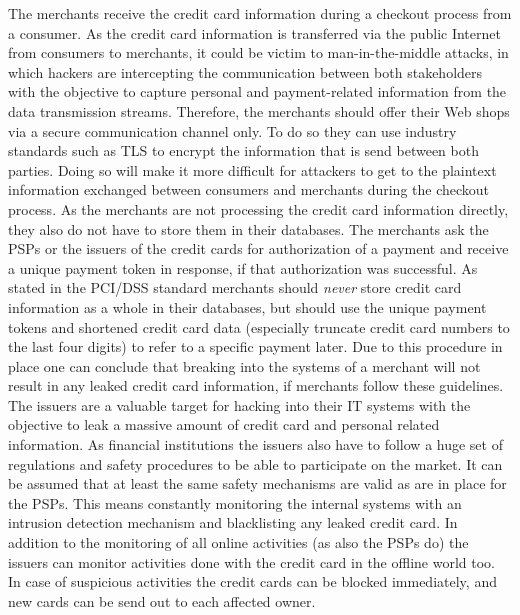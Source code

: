 The merchants receive the credit card information during a checkout process from a consumer. As the credit card information is transferred via the public Internet from consumers to merchants, it could be victim to man-in-the-middle attacks, in which hackers are intercepting the communication between both stakeholders with the objective to capture personal and payment-related information from the data transmission streams. Therefore, the merchants should offer their Web shops via a secure communication channel only. To do so they can use industry standards such as \gls{TLS} to encrypt the information that is send between both parties. Doing so will make it more difficult for attackers to get to the plaintext information exchanged between consumers and merchants during the checkout process. As the merchants are not processing the credit card information directly, they also do not have to store them in their databases. The merchants ask the \gls{PSP}s or the issuers of the credit cards for authorization of a payment and receive a unique payment token in response, if that authorization was successful. As stated in the \gls{PCI/DSS} standard \citep{virtue2009payment} merchants should \emph{never} store credit card information as a whole in their databases, but should use the unique payment tokens and shortened credit card data (especially truncate credit card numbers to the last four digits) to refer to a specific payment later. Due to this procedure in place one can conclude that breaking into the systems of a merchant will not result in any leaked credit card information, if merchants follow these guidelines. \\

The issuers are a valuable target for hacking into their \gls{IT} systems with the objective to leak a massive amount of credit card and personal related information. As financial institutions the issuers also have to follow a huge set of regulations and safety procedures to be able to participate on the market. It can be assumed that at least the same safety mechanisms are valid as are in place for the \gls{PSP}s. This means constantly monitoring the internal systems with an intrusion detection mechanism and blacklisting any leaked credit card. In addition to the monitoring of all online activities (as also the \gls{PSP}s do) the issuers can monitor activities done with the credit card in the offline world too. In case of suspicious activities the credit cards can be blocked immediately, and new cards can be send out to each affected owner. \\

